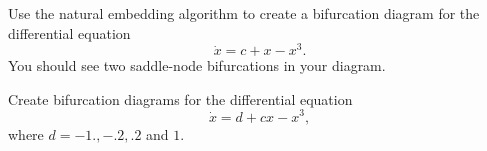 \begin{problem}
Use the natural embedding algorithm to create a bifurcation diagram for the differential equation
	\[\dot{x} = c + x - x^3.\]
You should see two saddle-node bifurcations in your diagram. 
\end{problem}

\begin{problem}
Create bifurcation diagrams for the differential equation
\[\dot{x} = d + cx-x^3,\]
where $d = -1., -.2, .2$ and $1.$

\end{problem}



%
%
